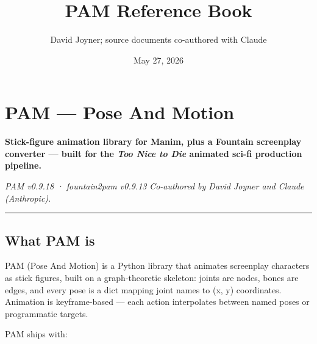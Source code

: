 \documentclass[
  11pt,
]{book}
\title{PAM Reference Book}
\author{David Joyner; source documents co-authored with Claude}
\date{May 27, 2026}
\begin{document}
\frontmatter
\maketitle

{
\hypersetup{linkcolor=}
\setcounter{tocdepth}{3}
\tableofcontents
}
\mainmatter
\chapter{PAM --- Pose And Motion}\label{pam-pose-and-motion}

\textbf{Stick-figure animation library for Manim, plus a Fountain
screenplay converter --- built for the \emph{Too Nice to Die} animated
sci-fi production pipeline.}

\emph{PAM v0.9.18 · fountain2pam v0.9.13} \emph{Co-authored by David
Joyner and Claude (Anthropic).}

\begin{center}\rule{0.5\linewidth}{0.5pt}\end{center}

\section{What PAM is}\label{what-pam-is}

PAM (Pose And Motion) is a Python library that animates screenplay
characters as stick figures, built on a graph-theoretic skeleton: joints
are nodes, bones are edges, and every pose is a dict mapping joint names
to (x, y) coordinates. Animation is keyframe-based --- each action
interpolates between named poses or programmatic targets.

PAM ships with:
\end{document}
